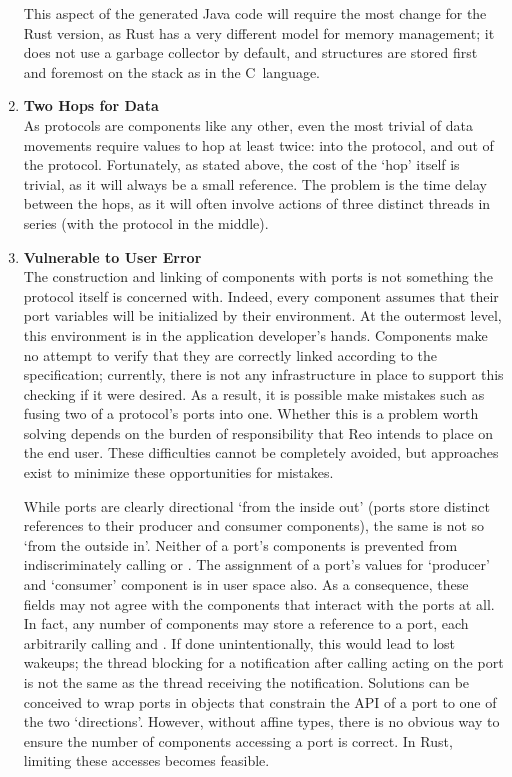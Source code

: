 \begin{enumerate}
	This aspect of the generated Java code will require the most change for the Rust version, as Rust has a very different model for memory management; it does not use a garbage collector by default, and structures are stored first and foremost on the stack as in the C~language.
	
	\item \textbf{Two Hops for Data}\\
	As protocols are components like any other, even the most trivial of data movements require values to hop at least twice: into the protocol, and out of the protocol. Fortunately, as stated above, the cost of the `hop' itself is trivial, as it will always be a small reference. The problem is the time delay between the hops, as it will often involve actions of three distinct threads in series (with the protocol in the middle). 
	
	\item \textbf{Vulnerable to User Error}\\
	The construction and linking of components with ports is not something the protocol itself is concerned with. Indeed, every component assumes that their port variables will be initialized by their environment. At the outermost level, this environment is in the application developer's hands. Components make no attempt to verify that they are correctly linked according to the specification; currently, there is not any infrastructure in place to support this checking if it were desired. As a result, it is possible make mistakes such as fusing two of a protocol's ports into one. Whether this is a problem worth solving depends on the burden of responsibility that Reo intends to place on the end user. These difficulties cannot be completely avoided, but approaches exist to minimize these opportunities for mistakes.
	
	While ports are clearly directional `from the inside out' (ports store distinct references to their producer and consumer components), the same is not so `from the outside in'. Neither of a port's components is prevented from indiscriminately calling  or . The assignment of a port's values for `producer' and `consumer' component is in user space also. As a consequence, these fields may not agree with the components that interact with the ports at all. In fact, any number of components may store a reference to a port, each arbitrarily calling  and . If done unintentionally, this would lead to lost wakeups; the thread blocking for a notification after calling acting on the port is not the same as the thread receiving the notification. Solutions can be conceived to wrap ports in objects that constrain the API of a port to one of the two `directions'. However, without affine types, there is no obvious way to ensure the number of components accessing a port is correct. In Rust, limiting these accesses becomes feasible.
	

\end{enumerate}

